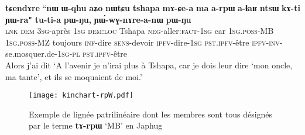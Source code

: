 \documentclass[oneside,a4paper,11pt]{article}
\newcommand{\ipa}[1]{{\phon\textbf{#1}}}
\begin{document}
 \begin{exe}
\ex 
\gll 
\ipa{tɕendɤre} 	``\ipa{nɯ} 	\ipa{ɯ-qhu} 	\ipa{aʑo} 	\ipa{nɯtɕu} 	\ipa{tshapa} 	\ipa{mɤ-ɕe-a} 	\ipa{ma} 	\ipa{a-rpɯ} 	\ipa{a-ɬaʁ} 	\ipa{ntsɯ} 	\ipa{kɤ-ti} 	\ipa{ɲɯ-ra"} 	\ipa{tu-ti-a} 	\ipa{pɯ-ŋu,} 	\ipa{ɲɯ́-wɣ-nɤre-a-nɯ} 	\ipa{pɯ-ŋu} \\
\textsc{lnk} \textsc{dem} \textsc{3sg}-après \textsc{1sg} \textsc{dem:loc} Tshapa \textsc{neg}-aller:\textsc{fact-1sg} car \textsc{1sg.poss}-MB \textsc{1sg.poss}-MZ toujours \textsc{inf}-dire \textsc{sens}-devoir \textsc{ipfv}-dire-\textsc{1sg} \textsc{pst.ipfv}-être \textsc{ipfv-inv}-se.mosquer.de-\textsc{1sg-pl} \textsc{pst.ipfv}-être \\
\glt Alors j'ai dit `A l'avenir je n'irai plus à Tshapa, car je dois leur dire `mon oncle, ma tante', et ils se moquaient de moi.'
\end{exe}
 \begin{figure}[H]
\caption{Exemple de lignée patrilinéaire dont les membres sont tous désignés par le terme \ipa{tɤ-rpɯ} `MB' en Japhug} \centering
\texttt{[image: kinchart-rpW.pdf]}
\end{figure}
 


 
\end{document}
